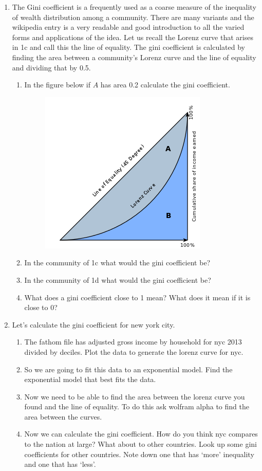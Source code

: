 \documentclass[12pt]{article}
\theoremstyle{plain}     %
\begin{document}
\begin{enumerate}
\begin{enumerate}
		\end{enumerate}
		\item The Gini coefficient is a frequently used  as a coarse measure of the inequality of wealth distribution among a community. There are many variants and the wikipedia entry is a very readable and good introduction to all the varied forms and applications of the idea. Let us recall the Lorenz curve that arises in 1c and call this the line of equality. The gini coefficient is calculated by finding the area between a community's Lorenz curve and the line of equality and dividing that by 0.5.
			\begin{enumerate}
				\item In the figure below if $A$ has area 0.2 calculate the gini coefficient.
					\begin{figure}[H]
						\hspace{2cm}\includegraphics[scale=.4]{1.png}
					\end{figure}
					\item In the community of 1c what would the gini coefficient be?
					\item In the community of 1d what would the gini coefficient be?
					\item What does a gini coefficient close to 1 mean? What does it mean if it is close to 0?
			\end{enumerate}
		\item Let's calculate the gini coefficient for new york city.
			\begin{enumerate}
			\item The fathom file has adjusted gross income by household for nyc 2013 divided by deciles. Plot the data to generate the lorenz curve for nyc.
			\item So we are going to fit this data to an exponential model. Find the exponential model that best fits the data.
			\item Now we need to be able to find the area between the lorenz curve you found and the line of equality. To do this ask wolfram alpha to find the area between the curves.
			\item Now we can calculate the gini coefficient. How do you think nyc compares to the nation at large? What about to other countries. Look up some gini coefficients for other countries. Note down one that has `more' inequality and one that has `less'.
			\end{enumerate}
\end{enumerate}
	
\end{document}
